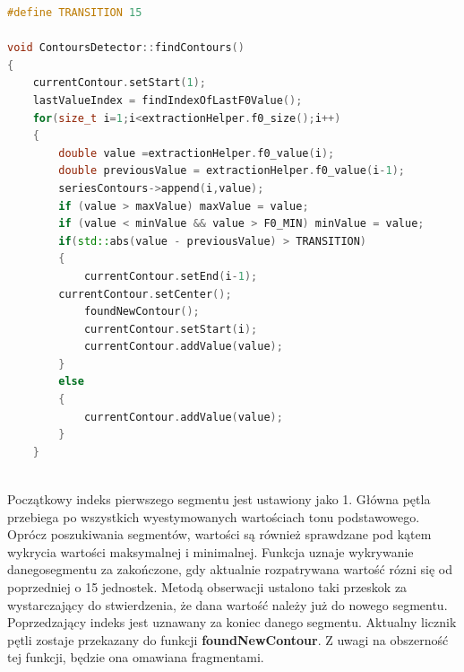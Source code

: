 \documentclass[a4paper,12 pt]{report}
\begin{document}
\newpage
\begin{lstlisting}[caption={Początkowa faza funkcji wykrywającej segmenty},label={lst:label},language=C++]
#define TRANSITION 15

void ContoursDetector::findContours()
{
    currentContour.setStart(1);
    lastValueIndex = findIndexOfLastF0Value();
    for(size_t i=1;i<extractionHelper.f0_size();i++)
    {
        double value =extractionHelper.f0_value(i);
        double previousValue = extractionHelper.f0_value(i-1); 
        seriesContours->append(i,value);
        if (value > maxValue) maxValue = value;
        if (value < minValue && value > F0_MIN) minValue = value;
        if(std::abs(value - previousValue) > TRANSITION)
        {
            currentContour.setEnd(i-1);
  	    currentContour.setCenter();    
            foundNewContour();
            currentContour.setStart(i);
            currentContour.addValue(value);
        }
        else
        {
            currentContour.addValue(value);
        }
    }
    
\end{lstlisting}
Początkowy indeks pierwszego segmentu jest ustawiony jako 1. Główna pętla przebiega po wszystkich wyestymowanych wartościach tonu podstawowego. Oprócz poszukiwania segmentów, wartości są również sprawdzane pod kątem wykrycia wartości maksymalnej i minimalnej. Funkcja uznaje wykrywanie danegosegmentu za zakończone, gdy aktualnie rozpatrywana wartość rózni się od poprzedniej o 15 jednostek. Metodą obserwacji ustalono taki przeskok za wystarczający do stwierdzenia, że dana wartość należy już do nowego segmentu. Poprzedzający indeks jest uznawany za koniec danego segmentu. Aktualny licznik pętli zostaje przekazany do funkcji \textbf{foundNewContour}. Z uwagi na obszerność tej funkcji, będzie ona omawiana fragmentami.
\end{document}
